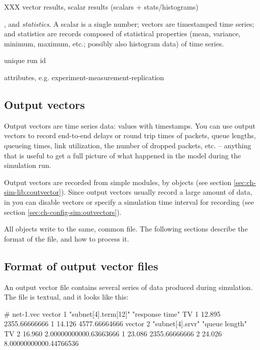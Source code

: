 XXX vector results, scalar results (scalars + stats/histograms)

, and \textit{statistics}. A scalar is a single number;
vectors are timestamped time series; and statistics are records composed of
statistical properties (mean, variance, minimum, maximum, etc.; possibly
also histogram data) of time series.

unique run id

attributes, e.g. experiment-measurement-replication


\subsection{Output vectors}
\label{sec:ch-ana-sim:output-vectors}

Output vectors are time series data: values with timestamps.
You can use output vectors to record end-to-end delays or
round trip times of packets, queue lengths, queueing times,
link utilization, the number of dropped packets, etc. --
anything that is useful to get a full picture of what happened
in the model during the simulation run.

Output vectors are recorded from simple modules, by  objects
(see section \ref{sec:ch-sim-lib:coutvector}). Since output vectors usually
record a large amount of data, in  you can disable vectors
or specify a simulation time interval for recording
(see section \ref{sec:ch-config-sim:outvectors}).

All  objects write to the same, common file.
The following sections describe the format of the file, and
how to process it.


\subsection{Format of output vector files}

An output vector file contains several
series of data produced during simulation. The file is textual, and it
looks like this:

\begin{filelisting}
# net-1.vec
vector 1   "subnet[4].term[12]"  "response time"  TV
1  12.895  2355.66666666
1  14.126  4577.66664666
vector 2   "subnet[4].srvr"  "queue length"  TV
2  16.960  2.00000000000.63663666
1  23.086  2355.66666666
2  24.026  8.00000000000.44766536
\end{filelisting}

